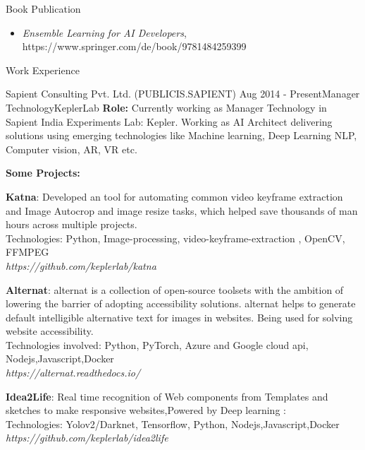 \documentclass{resume} %
\begin{document}
\begin{rSection}{Book Publication}
\begin{itemize}
\item  \emph{Ensemble Learning for AI Developers}, https://www.springer.com/de/book/9781484259399 

\end{itemize}

\end{rSection}



\begin{rSection}{Work Experience}


\begin{rSubsection}{Sapient Consulting Pvt. Ltd. (PUBLICIS.SAPIENT) }{Aug 2014 - Present}{Manager Technology}{KeplerLab}
\textbf{Role:} Currently working as Manager Technology in Sapient India Experiments Lab: Kepler.
Working as AI Architect delivering solutions using emerging technologies like 
Machine learning, Deep Learning NLP, Computer vision, AR, VR etc. 

\textbf{Some Projects:} 

\item \textbf{Katna}:
Developed an tool for automating common video keyframe extraction and
Image Autocrop and image resize tasks, which 
helped save thousands of man hours across multiple projects.\\
Technologies: Python, Image-processing, video-keyframe-extraction , OpenCV, FFMPEG \\
\textit{https://github.com/keplerlab/katna}

\item \textbf{Alternat}:
alternat is a collection of open-source toolsets with the ambition of
lowering the barrier of adopting accessibility solutions.
alternat helps to generate default intelligible alternative text for images in websites.
Being used for solving website accessibility. \\
Technologies involved: Python, PyTorch, Azure and Google cloud api, Nodejs,Javascript,Docker \\
\textit{https://alternat.readthedocs.io/}

\item \textbf{Idea2Life}:
Real time recognition of Web components from Templates and sketches to make 
responsive websites,Powered by Deep learning :\\
Technologies: Yolov2/Darknet, Tensorflow, Python, Nodejs,Javascript,Docker \\
\textit{https://github.com/keplerlab/idea2life}


\end{rSubsection}
\end{rSection}
\end{document}
